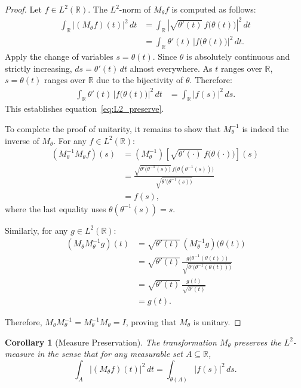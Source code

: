 \documentclass[11pt]{article}
\newtheorem{corollary}{Corollary}
\begin{document}
\begin{proof}
Let $f\in L^2(\mathbb{R})$. The $L^2$-norm of $M_\theta f$ is computed as follows:
\begin{align}
    \int_{\mathbb{R}}\lvert (M_\theta f)(t)\rvert^2\,dt &= \int_{\mathbb{R}}\left|\sqrt{\theta'(t)}\,f\bigl(\theta(t)\bigr)\right|^2\,dt\\
    &= \int_{\mathbb{R}}\theta'(t)\,\lvert f\bigl(\theta(t)\bigr)\rvert^2\,dt.
\end{align}
Apply the change of variables $s=\theta(t)$. Since $\theta$ is absolutely continuous and strictly increasing, $ds=\theta'(t)\,dt$ almost everywhere. As $t$ ranges over $\mathbb{R}$, $s=\theta(t)$ ranges over $\mathbb{R}$ due to the bijectivity of $\theta$. Therefore:
\begin{align}
    \int_{\mathbb{R}}\theta'(t)\,\lvert f\bigl(\theta(t)\bigr)\rvert^2\,dt &= \int_{\mathbb{R}}\lvert f(s)\rvert^2\,ds.
\end{align}
This establishes equation~\eqref{eq:L2_preserve}.

To complete the proof of unitarity, it remains to show that $M_\theta^{-1}$ is indeed the inverse of $M_\theta$. For any $f\in L^2(\mathbb{R})$:
\begin{align}
    (M_\theta^{-1}M_\theta f)(s) &= (M_\theta^{-1})\left[\sqrt{\theta'(\cdot)}\,f\bigl(\theta(\cdot)\bigr)\right](s)\\
    &= \frac{\sqrt{\theta'\bigl(\theta^{-1}(s)\bigr)}\,f\bigl(\theta(\theta^{-1}(s))\bigr)}{\sqrt{\theta'\bigl(\theta^{-1}(s)\bigr)}}\\
    &= f(s),
\end{align}
where the last equality uses $\theta(\theta^{-1}(s)) = s$.

Similarly, for any $g\in L^2(\mathbb{R})$:
\begin{align}
    (M_\theta M_\theta^{-1} g)(t) &= \sqrt{\theta'(t)}\,(M_\theta^{-1} g)\bigl(\theta(t)\bigr)\\
    &= \sqrt{\theta'(t)}\,\frac{g\bigl(\theta^{-1}(\theta(t))\bigr)}{\sqrt{\theta'\bigl(\theta^{-1}(\theta(t))\bigr)}}\\
    &= \sqrt{\theta'(t)}\,\frac{g(t)}{\sqrt{\theta'(t)}}\\
    &= g(t).
\end{align}

Therefore, $M_\theta M_\theta^{-1} = M_\theta^{-1} M_\theta = I$, proving that $M_\theta$ is unitary.
\end{proof}

\begin{corollary}[Measure Preservation]\label{cor:measure_preserve}
The transformation $M_\theta$ preserves the $L^2$-measure in the sense that for any measurable set $A\subseteq\mathbb{R}$,
\begin{equation}\label{eq:measure_preserve_sets}
    \int_A \lvert (M_\theta f)(t)\rvert^2\,dt = \int_{\theta(A)} \lvert f(s)\rvert^2\,ds.
\end{equation}
\end{corollary}
\end{document}
